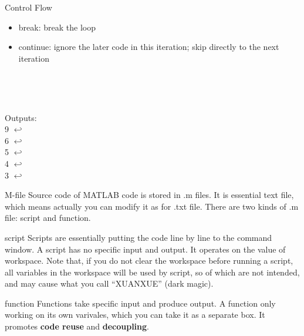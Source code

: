 \begin{frame}{Control Flow}
\begin{itemize}
\item break: break the loop
\item continue: ignore the later code in this iteration; skip directly to the next iteration
\end{itemize}
\begin{minipage}{0.05\textwidth}
~\\
\end{minipage}
\begin{minipage}{0.5\textwidth}

\end{minipage}
\begin{minipage}{0.05\textwidth}
~\\
\end{minipage}
\begin{minipage}{0.35\textwidth}
Outputs: \\
9 $\hookleftarrow$ \\
6 $\hookleftarrow$ \\
5 $\hookleftarrow$ \\
4 $\hookleftarrow$ \\
3 $\hookleftarrow$ \\
\end{minipage}
\end{frame}

\begin{frame}{M-file}
Source code of MATLAB code is stored in .m files. It is essential text file, which means actually you can modify it as for .txt file. There are two kinds of .m file: script and function.
\begin{block}{script}
Scripts are essentially putting the code line by line to the command window. A script has no specific input and output. It operates on the value of workspace. Note that, if you do not clear the workspace before running a script, all variables in the workspace will be used by script, so of which are not intended, and may cause what you call ``XUANXUE'' (dark magic). \footnotemark
\end{block}
\begin{block}{function}
Functions take specific input and produce output. A function only working on its own varivales, which you can take it as a separate box. It promotes \textbf{code reuse} and \textbf{decoupling}.
\end{block}
\end{frame}

